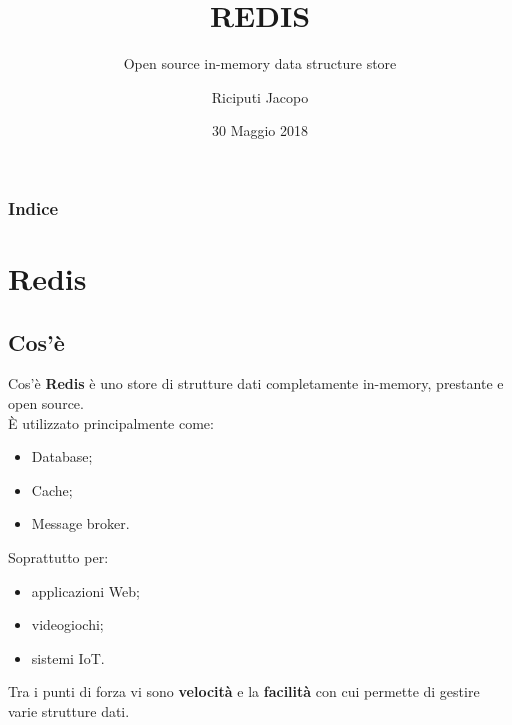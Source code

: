 \documentclass[xcolor=dvipsnames]{beamer}
\title[Introduzione a Redis]{REDIS}
\subtitle[Open source in-memory data structure store]{Open source in-memory data structure store}
\author[Riciputi Jacopo]{Riciputi Jacopo}
\date{30 Maggio 2018}
\begin{document}
\begin{frame}
  \titlepage
\end{frame}

\begin{frame}
\frametitle{Indice}
\tableofcontents
\end{frame}

  \section{Redis}
    \subsection{Cos'è}
      \begin{frame}{Cos'è}
          \textbf{Redis} è uno store di strutture dati completamente in-memory, prestante e open source. \\
          È utilizzato principalmente come:
          \begin{itemize}
            \item Database;
            \item Cache;
            \item Message broker.
          \end{itemize}
          Soprattutto per:
          \begin{itemize}
            \item applicazioni Web;
            \item videogiochi;
            \item sistemi IoT.
          \end{itemize}

          Tra i punti di forza vi sono \textbf{velocità} e la \textbf{facilità} con cui permette di gestire varie strutture dati.
      \end{frame}
\end{document}
